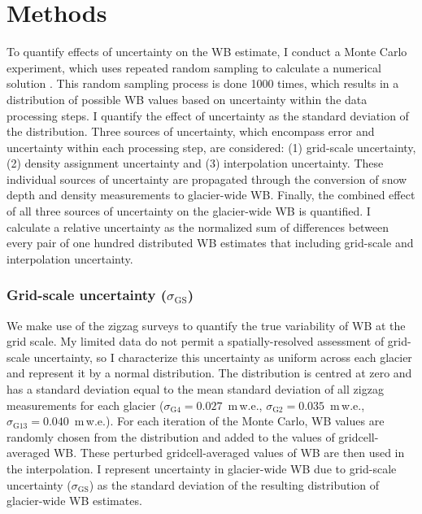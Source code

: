 \documentclass{sfuthesis}
\begin{document}
\section{Methods}
\label{sec:Unc_methods}

To quantify effects of uncertainty on the WB estimate, I conduct a Monte Carlo experiment, which uses repeated random sampling to calculate a numerical solution \citep{Metropolis1949}. This random sampling process is done 1000 times, which results in a distribution of possible WB values based on uncertainty within the data processing steps. I quantify the effect of uncertainty as the standard deviation of the distribution. Three sources of uncertainty, which encompass error and uncertainty within each processing step, are considered: (1) grid-scale uncertainty, (2) density assignment uncertainty and (3) interpolation uncertainty. These individual sources of uncertainty are propagated through the conversion of snow depth and density measurements to glacier-wide WB. Finally, the combined effect of all three sources of uncertainty on the glacier-wide WB is quantified. I calculate a relative uncertainty as the normalized sum of differences between every pair of one hundred distributed WB estimates that including grid-scale and interpolation uncertainty.

\subsubsection{Grid-scale uncertainty ($\sigma_{\mathrm{GS}}$)}
We make use of the zigzag surveys to quantify the true variability of WB at the grid scale. My limited data do not permit a spatially-resolved assessment of grid-scale uncertainty, so I characterize this uncertainty as uniform across each glacier and represent it by a normal distribution. The distribution is centred at zero and has a standard deviation equal to the mean standard deviation of all zigzag measurements for each glacier ($\sigma_{\mathrm{G4}} = 0.027 $ \,m\,w.e., $\sigma_{\mathrm{G2}} = 0.035$ \,m\,w.e., $\sigma_{\mathrm{G13}} = 0.040 $ \,m\,w.e.). For each iteration of the Monte Carlo, WB values are randomly chosen from the distribution and added to the values of gridcell-averaged WB. These perturbed gridcell-averaged values of WB are then used in the interpolation. I represent uncertainty in glacier-wide WB due to grid-scale uncertainty ($\sigma_{\mathrm{GS}}$) as the standard deviation of the resulting distribution of glacier-wide WB estimates.  
\end{document}
